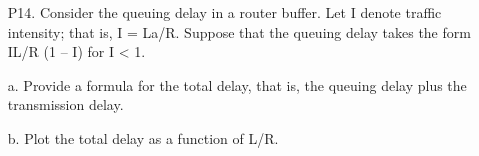 \documentclass[]{article}
\begin{document}
\begin{enumerate}
	\item[P14.]
	Consider the queuing delay in a router buffer. Let I denote traffic intensity;
	that is, I = La/R. Suppose that the queuing delay takes the form IL/R (1 – I)
	for I < 1.
	
	a. Provide a formula for the total delay, that is, the queuing delay plus the
	transmission delay.
	
	b. Plot the total delay as a function of L/R.
\end{enumerate}
\end{document}
